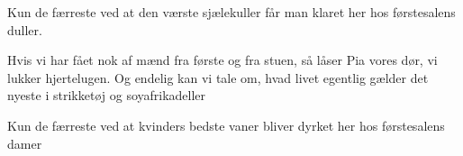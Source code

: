 \documentclass[a4paper,11pt]{article}
\begin{document}
\begin{song}
 Kun de færreste ved
          at den værste sjælekuller
          får man klaret her
          hos førstesalens duller.



 Hvis vi har fået nok af mænd
          fra første og fra stuen,
          så låser Pia vores dør,
          vi lukker hjertelugen.
          Og endelig kan vi tale om,
          hvad livet egentlig gælder
          det nyeste i strikketøj
          og soyafrikadeller

 Kun de færreste ved
          at kvinders bedste vaner
          bliver dyrket her
          hos førstesalens damer






\end{song}
\end{document}
